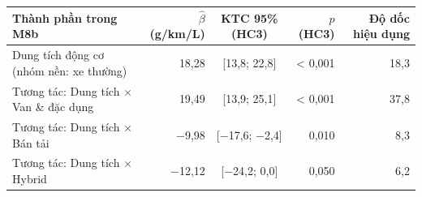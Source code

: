 \begin{tabular}{@{}l r c r r@{}}
\toprule
Thành phần trong M8b & $\hat\beta$ (g/km/L) & KTC 95\% (HC3) & $p$ (HC3) & Độ dốc hiệu dụng \\
\midrule
Dung tích động cơ (nhóm nền: xe thường) & 18,28 & [13,8; 22,8] & < 0,001 & 18,3 \\
Tương tác: Dung tích $\times$ Van \& đặc dụng & 19,49 & [13,9; 25,1] & < 0,001 & 37,8 \\
Tương tác: Dung tích $\times$ Bán tải & −9,98 & [−17,6; −2,4] & 0,010 & 8,3 \\
Tương tác: Dung tích $\times$ Hybrid & −12,12 & [−24,2; 0,0] & 0,050 & 6,2 \\
\bottomrule
\end{tabular}
